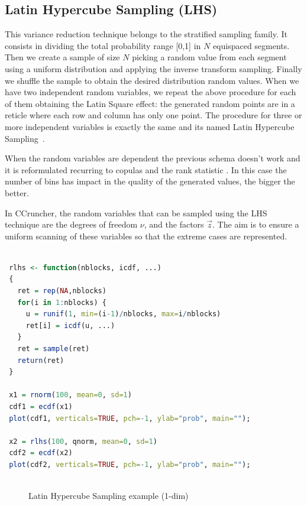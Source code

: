 \documentclass[11pt,fleqn]{book} %
\begin{document}
\subsection{Latin Hypercube Sampling (LHS)}
This variance reduction technique 
belongs to the stratified sampling family. It consists in dividing the total 
probability range [0,1] in $N$ equispaced segments. Then we create a 
sample of size $N$ picking a random value from each segment using a uniform 
distribution and applying the inverse transform sampling. Finally we shuffle 
the sample to obtain the desired distribution random values. When we have 
two independent random variables, we repeat the above procedure for each of 
them obtaining the Latin Square effect: the generated random points are in
a reticle where each row and column has only one point. The procedure for
three or more independent variables is exactly the same and its named Latin 
Hypercube Sampling~\cite{glasserman:1997}.

When the random variables are dependent the previous schema doesn't work 
and it is reformulated recurring to copulas and the rank statistic 
\cite{wolfgang:2008}. In this case the number of bins has impact in the 
quality of the generated values, the bigger the better.

In CCruncher, the random variables that can be sampled using the LHS 
technique are the degrees of freedom $\nu$, and the factors $\vec{z}$. 
The aim is to ensure a uniform scanning of these variables so that the
extreme cases are represented.

\begin{lstlisting}[language=R, label=sc:lhs, caption=Latin Hypercube Sampling example (R script)]

 rlhs <- function(nblocks, icdf, ...) 
 {
   ret = rep(NA,nblocks)
   for(i in 1:nblocks) {
     u = runif(1, min=(i-1)/nblocks, max=i/nblocks)
     ret[i] = icdf(u, ...)
   }
   ret = sample(ret)
   return(ret)
 }

 x1 = rnorm(100, mean=0, sd=1)
 cdf1 = ecdf(x1)
 plot(cdf1, verticals=TRUE, pch=-1, ylab="prob", main="");
 
 x2 = rlhs(100, qnorm, mean=0, sd=1)
 cdf2 = ecdf(x2)
 plot(cdf2, verticals=TRUE, pch=-1, ylab="prob", main="");
 
\end{lstlisting}
\begin{figure}[!ht]
	\centering
	\caption{Latin Hypercube Sampling example (1-dim)}
	\label{fig:lhs} 
\end{figure}
\end{document}
